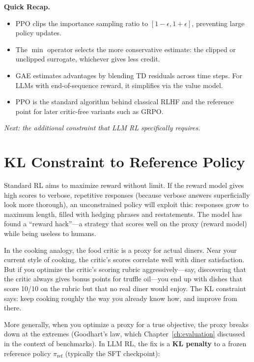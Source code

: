 \begin{quickrecap}
\textbf{Quick Recap.}
\begin{itemize}[nosep,leftmargin=1.5em]
  \item PPO clips the importance sampling ratio to $[1-\epsilon, 1+\epsilon]$, preventing large policy updates.
  \item The $\min$ operator selects the more conservative estimate: the clipped or unclipped surrogate, whichever gives less credit.
  \item GAE estimates advantages by blending TD residuals across time steps. For LLMs with end-of-sequence reward, it simplifies via the value model.
  \item PPO is the standard algorithm behind classical RLHF and the reference point for later critic-free variants such as GRPO.
\end{itemize}
\textit{Next: the additional constraint that LLM RL specifically requires.}
\end{quickrecap}


\section{KL Constraint to Reference Policy}
\label{sec:kl-rl}

Standard RL aims to maximize reward without limit. If the reward model gives high scores to verbose, repetitive responses (because verbose answers superficially look more thorough), an unconstrained policy will exploit this: responses grow to maximum length, filled with hedging phrases and restatements. The model has found a ``reward hack''---a strategy that scores well on the proxy (reward model) while being useless to humans.

In the cooking analogy, the food critic is a proxy for actual diners. Near your current style of cooking, the critic's scores correlate well with diner satisfaction. But if you optimize the critic's scoring rubric aggressively---say, discovering that the critic always gives bonus points for truffle oil---you end up with dishes that score 10/10 on the rubric but that no real diner would enjoy. The KL constraint says: keep cooking roughly the way you already know how, and improve from there.

More generally, when you optimize a proxy for a true objective, the proxy breaks down at the extremes (Goodhart's law, which Chapter~\ref{ch:evaluation} discussed in the context of benchmarks). In LLM RL, the fix is a \textbf{KL penalty} to a frozen reference policy $\pi_{\text{ref}}$ (typically the SFT checkpoint):

